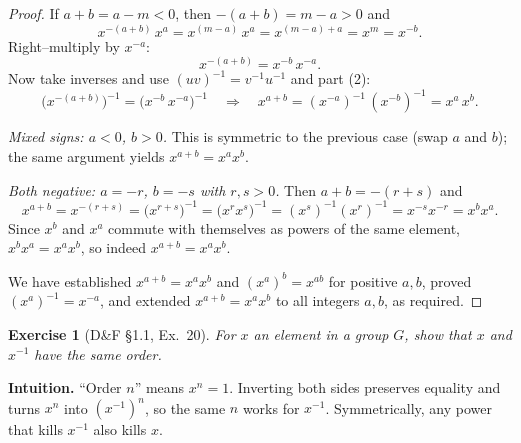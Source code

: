\documentclass[12pt]{article}
\newtheorem{exercise}[theorem]{Exercise}
\theoremstyle{definition}
\begin{document}
\begin{proof}
If $a+b=a-m<0$, then $-(a+b)=m-a>0$ and
\[
x^{-(a+b)}\,x^{a}
= x^{(m-a)}\,x^{a}
= x^{(m-a)+a}
= x^{m}
= x^{-b}.
\]
Right–multiply by $x^{-a}$:
\[
x^{-(a+b)} = x^{-b}\,x^{-a}.
\]
Now take inverses and use $(uv)^{-1}=v^{-1}u^{-1}$ and part (2):
\[
\bigl(x^{-(a+b)}\bigr)^{-1}
= \bigl(x^{-b}\,x^{-a}\bigr)^{-1}
\quad\Longrightarrow\quad
x^{a+b} = (x^{-a})^{-1}\,(x^{-b})^{-1}
= x^{a}\,x^{b}.
\]

\noindent
\emph{Mixed signs: $a<0$, $b>0$.}
This is symmetric to the previous case (swap $a$ and $b$); the same argument yields $x^{a+b}=x^a x^b$.

\noindent
\emph{Both negative: $a=-r$, $b=-s$ with $r,s>0$.}
Then $a+b=-(r+s)$ and
\[
x^{a+b}
= x^{-(r+s)}
= \bigl(x^{r+s}\bigr)^{-1}
= \bigl(x^{r}x^{s}\bigr)^{-1}
= (x^{s})^{-1}(x^{r})^{-1}
= x^{-s}x^{-r}
= x^{b}x^{a}.
\]
Since $x^{b}$ and $x^{a}$ commute with themselves as powers of the same element, $x^{b}x^{a}=x^{a}x^{b}$,
so indeed $x^{a+b}=x^{a}x^{b}$.

\dotfill

\noindent
We have established $x^{a+b}=x^{a}x^{b}$ and $(x^{a})^{b}=x^{ab}$ for positive $a,b$, proved $(x^{a})^{-1}=x^{-a}$,
and extended $x^{a+b}=x^{a}x^{b}$ to all integers $a,b$, as required.
\end{proof}

\newpage

\begin{exercise}[D\&F §1.1, Ex.~20]
For $x$ an element in a group $G$, show that $x$ and $x^{-1}$ have the same order.
\end{exercise}

\dotfill

\noindent
\textbf{Intuition.}
“Order $n$” means $x^n=1$. Inverting both sides preserves equality and turns $x^n$ into $(x^{-1})^n$,
so the same $n$ works for $x^{-1}$. Symmetrically, any power that kills $x^{-1}$ also kills $x$.

\dotfill
\end{document}
